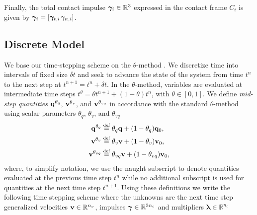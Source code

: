 Finally, the total contact
impulse ${\bm\gamma}_i\in\mathbb{R}^3$ expressed in the contact frame $C_i$ is given
by ${\bm\gamma}_i=[{\bm\gamma}_{t,i}\,\gamma_{n,i}]$.

\subsection{Discrete Model}

We base our time-stepping scheme on the $\theta\text{-method}$ \cite[\S
II.7]{bib:hairer2008solving}. We discretize time into intervals of fixed size
$\delta t$ and seek to advance the state of the system from time $t^n$ to the
next step at $t^{n+1} = t^n + \delta t$. In the $\theta\text{-method}$,
variables are evaluated at intermediate time steps $t^\theta = \theta
t^{n+1}+(1-\theta)t^{n}$, with $\theta \in [0, 1]$. We define \emph{mid-step
quantities} ${\mathbf{q}}^{\theta_{q}}$, ${\mathbf{v}}^{\theta_{v}}$, and
${\mathbf{v}}^{\theta_{vq}}$ in accordance with the standard $\theta\text{-method}$
using scalar parameters $\theta_q$, $\theta_v$, and $\theta_{vq}$
\begin{align}
	\mf{q}^{\theta_q} &\defeq \theta_q\mf{q} + (1-\theta_{q})\mf{q}_0,\nonumber\\
	\mf{v}^{\theta_v} &\defeq \theta_v\mf{v} + (1-\theta_v)\mf{v}_0,\nonumber\\
	\mf{v}^{\theta_{vq}} &\defeq \theta_{vq}\mf{v} + (1-\theta_{vq})\mf{v}_0,
	\label{eq:theta_method}
\end{align}
where, to simplify notation, we use the naught subscript to denote quantities
evaluated at the previous time step $t^n$ while no additional subscript is used
for quantities at the next time step $t^{n+1}$. Using these definitions we write
the following time stepping scheme where the unknowns are the next time step
generalized velocities ${\mathbf{v}}\in\mathbb{R}^{n_v}$, impulses
${\bm\gamma}\in\mathbb{R}^{3n_c}$ and multipliers ${\bm\lambda}\in\mathbb{R}^{n_c}$
